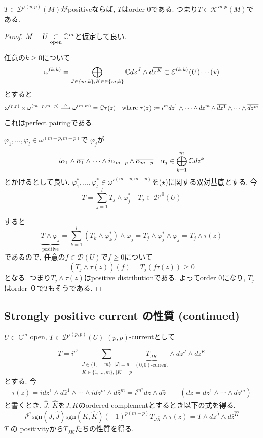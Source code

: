 \begin{tcolorbox}[mybox]
\begin{lem}
\label{lem-M-7.4.10}
$T \in {\mathcal{D}'}^{(p,p)}(M)$がpositiveならば, $T$はorder 0である. 
つまり$T \in {\mathcal{K}'}^{p,p}(M)$である. 
\end{lem}
\end{tcolorbox}
\begin{proof}
$M=U \underset{\text{open}}{\subset} \mathbb{C}^m$と仮定して良い. 

任意の$k \ge 0$について
$$
\omega^{(k,k)}
=
 \bigoplus_{J \in \{m ; k\}, K \in \in \{m; k \}}
\mathbb{C} dz^J \wedge d \overline{z^K}
\subset  {\mathcal{E}}^{(k,k)}(U)
\cdots \text{($\star$)}
$$
とすると
$$
\omega^{(p,p)} 
\times 
\omega^{(m-p,m-p)} 
\overset{\wedge}{\longrightarrow}
\omega^{(m,m)}
=\mathbb{C} \tau(z)
\quad 
\text{where }
\tau(z):= i^{m}dz^1 \wedge \cdots \wedge dz^m \wedge \overline{dz^1} \wedge \cdots \wedge \overline{dz^m}
$$
これはperfect pairingである. 

$\varphi_1, \ldots, \varphi_l \in \omega^{(m-p,m-p)}$で
$\varphi_j$が
$$
i\alpha_1\wedge\overline{\alpha_1}\wedge\cdots\wedge
i\alpha_{m-p}\wedge\overline{\alpha_{m-p}}
\quad 
\alpha_j \in \bigoplus_{k=1}^{m} \mathbb{C} dz^k
$$
とかけるとして良い. 
$\varphi^{*}_1, \ldots, \varphi^{*}_l \in {\omega'}^{(m-p,m-p)}$を($\star$)に関する双対基底とする. 
今
$$
T=\sum_{j=1}^{l} T_j \wedge \varphi^{*}_j
\quad 
T_j \in {\mathcal{D}'}^{0}(U)
$$

すると
$$
\underbrace{T \wedge \varphi_j}_{\text{positive}}
=
\sum_{k=1}^{l}
(T_k \wedge \varphi^{*}_k) \wedge \varphi_j
= T_j \wedge \varphi^{*}_j\wedge \varphi_j
= T_j \wedge \tau (z)
$$
であるので, 任意の$f \in \mathcal{D}(U)$で$f \ge 0$について
$$
(T_j \wedge \tau (z))(f)
= T_j (f \tau(z)) \ge 0
$$
となる. 
つまり$T_j \wedge \tau (z)$はpositive distributionである. 
よってorder 0になり, $T_j$はorder ０で$T$もそうである. 
\end{proof}



\subsection{Strongly positive current の性質 (continued)}
$U \subset \mathbb{C}^m$ open, $T \in \mathcal{D}'^{(p,p)}(U)$ $(p,p)$-currentとして

\begin{equation*}
T = i^{p^2} \sum_{\substack{J\in\{1,\ldots,m\},\, |J|=p\\ K\in\{1,\ldots,m\},\, |K|=p}} \underbrace{T_{J\bar K}}_{\text{$(0,0)$-current}} \wedge dz^J \wedge d\bar z^K
\end{equation*}
とする. 今
\begin{align*}
\tau(z) = i dz^1 \wedge d\bar z^1 \wedge \cdots \wedge i dz^m \wedge d\bar z^m
= i^{m^2} dz \wedge d\bar z \qquad (dz = dz^1 \wedge \cdots \wedge dz^m)
\end{align*}
と書くとき, $\hat{J}$, $\hat{K}$を$J, K$のordered complementとするとき以下の式を得る.
\[
i^{p^{2}}
\mathrm{sgn}(J, \widehat{J})
\mathrm{sgn}(K, \widehat{K})
(-1)^{p(m-p)}
T_{J \bar K}
\wedge 
\tau(z)
=T \wedge dz^{\hat{J}} \wedge  d \bar{z}^{\hat{K}}
\]
$T$ の positivityから$T_{J\bar K}$たちの性質を得る. 

